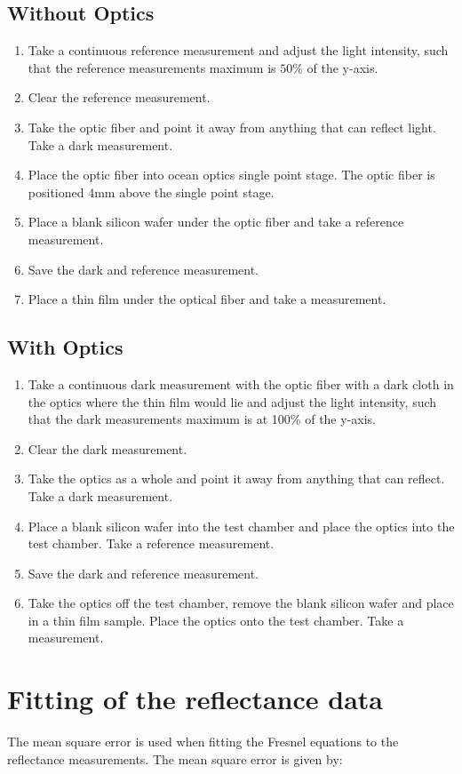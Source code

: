 \documentclass[MasterThesisMain.tex]{subfiles}
\begin{document}
\subsection{Without Optics}
\begin{enumerate}
\item Take a continuous reference measurement and adjust the light intensity, such that the reference measurements maximum is $50\%$ of the y-axis.
\item Clear the reference measurement.
\item Take the optic fiber and point it away from anything that can reflect light. Take a dark measurement.
\item Place the optic fiber into ocean optics single point stage. The optic fiber is positioned $4$mm above the single point stage.
\item Place a blank silicon wafer under the optic fiber and take a reference measurement.
\item Save the dark and reference measurement.
\item Place a thin film under the optical fiber and take a measurement.  
\end{enumerate}

\subsection{With Optics}
\begin{enumerate}
\item Take a continuous dark measurement with the optic fiber with a dark cloth in the optics where the thin film would lie and adjust the light intensity, such that the dark measurements maximum is at 100$\%$ of the y-axis.
\item Clear the dark measurement.
\item Take the optics as a whole and point it away from anything that can reflect. Take a dark measurement.
\item Place a blank silicon wafer into the test chamber and place the optics into the test chamber. Take a reference measurement.
\item Save the dark and reference measurement.
\item Take the optics off the test chamber, remove the blank silicon wafer and place in a thin film sample. Place the optics onto the test chamber. Take a measurement.
\end{enumerate}

\section{Fitting of the reflectance data} \label{sec:fitting}
The mean square error is used when fitting the Fresnel equations to the reflectance measurements. The mean square error is given by:
\end{document}
